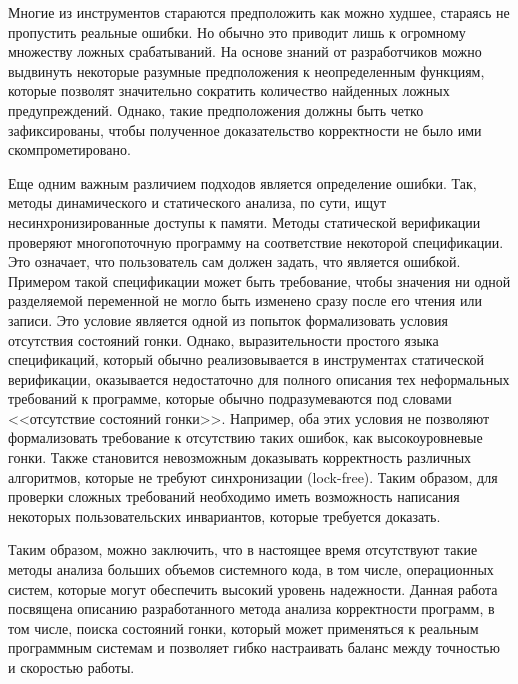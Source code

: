 Многие из инструментов стараются предположить как можно худшее, стараясь не пропустить реальные ошибки.
Но обычно это приводит лишь к огромному множеству ложных срабатываний.
На основе знаний от разработчиков можно выдвинуть некоторые разумные предположения к неопределенным функциям, которые позволят значительно сократить количество найденных ложных предупреждений.
Однако, такие предположения должны быть четко зафиксированы, чтобы полученное доказательство корректности не было ими скомпрометировано.

Еще одним важным различием подходов является определение ошибки. 
Так, методы динамического и статического анализа, по сути, ищут несинхронизированные доступы к памяти.
Методы статической верификации проверяют многопоточную программу на соответствие некоторой спецификации.
Это означает, что пользователь сам должен задать, что является ошибкой.
Примером такой спецификации может быть требование, чтобы значения ни одной разделяемой переменной не могло быть изменено сразу после его чтения или записи.
Это условие является одной из попыток формализовать условия отсутствия состояний гонки.
Однако, выразительности простого языка спецификаций, который обычно реализовывается в инструментах статической верификации, оказывается недостаточно для полного описания тех неформальных требований к программе, которые обычно подразумеваются под словами <<отсутствие состояний гонки>>.
Например, оба этих условия не позволяют формализовать требование к отсутствию таких ошибок, как высокоуровневые гонки.
Также становится невозможным доказывать корректность различных алгоритмов, которые не требуют синхронизации (lock-free).
Таким образом, для проверки сложных требований необходимо иметь возможность написания некоторых пользовательских инвариантов, которые требуется доказать.

Таким образом, можно заключить, что в настоящее время отсутствуют такие методы анализа больших объемов системного кода, в том числе, операционных систем, которые могут обеспечить высокий уровень надежности.
Данная работа посвящена описанию разработанного метода анализа корректности программ, в том числе, поиска состояний гонки, который может применяться к реальным программным системам и позволяет гибко настраивать баланс между точностью и скоростью работы.
